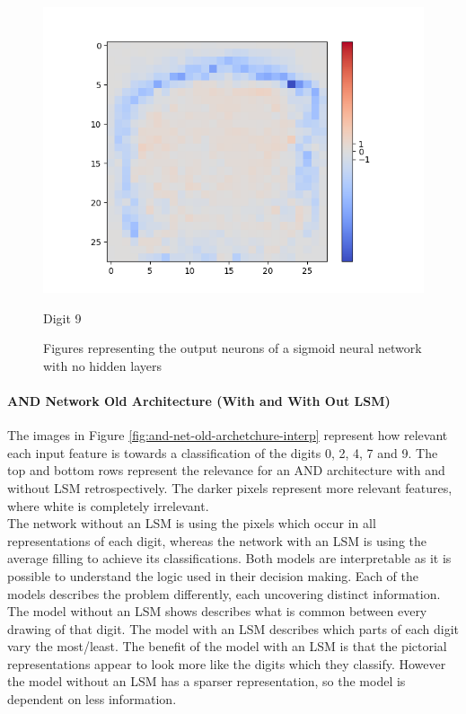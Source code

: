 \begin{figure}[H]
\begin{minipage}[b]{0.19\textwidth}
		\includegraphics[width=\textwidth]{Sigmoid(NO-Hidden)/Layer0-Neuron-9.png}
		\caption{Digit 9}
	\end{minipage}
	\hfill
	\label{fig:sigmoid-weights-no-hidden}
	\caption{Figures representing the output neurons of a sigmoid neural network with no hidden layers}
\end{figure}


\paragraph{AND Network Old Architecture (With and With Out LSM)}
The images in Figure \ref{fig:and-net-old-archetchure-interp} represent how relevant each input feature is towards a classification of the digits 0, 2, 4, 7 and 9. The top and bottom rows represent the relevance for an AND architecture with and without LSM retrospectively. The darker pixels represent more relevant features, where white is completely irrelevant.\\

The network without an LSM is using the pixels which occur in all representations of each digit, whereas the network with an LSM is using the average filling to achieve its classifications. Both models are interpretable as it is possible to understand the logic used in their decision making. Each of the models describes the problem differently, each uncovering distinct information. The model without an LSM shows describes what is common between every drawing of that digit. The model with an LSM describes which parts of each digit vary the most/least. The benefit of the model with an LSM is that the pictorial representations appear to look more like the digits which they classify. However the model without an LSM has a sparser representation, so the model is dependent on less information.

